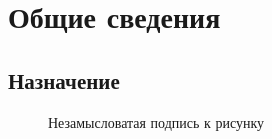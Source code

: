 \chapter{Общие сведения}

\section{Назначение}

\lipsum[2]

\begin{figure}[h!]
    \centering
    \imgplaceholder
    \caption{Незамысловатая подпись к рисунку}
    \label{img:test}
\end{figure}

\lipsum[3]
